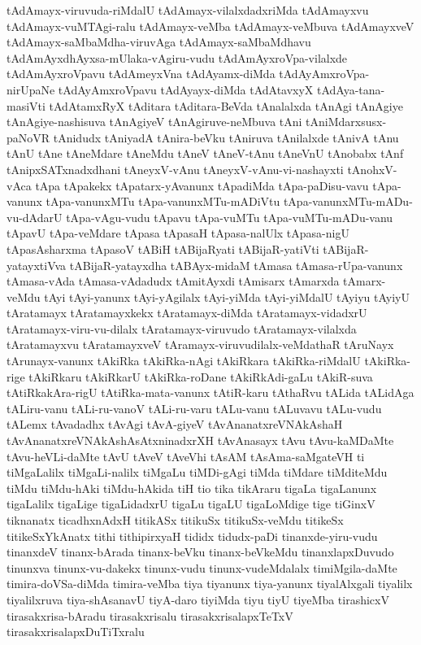 {tAdAmayx-viruvuda-riMdalU
tAdAmayx-vilalxdadxriMda
tAdAmayxvu
tAdAmayx-vuMTAgi-ralu
tAdAmayx-veMba
tAdAmayx-veMbuva
tAdAmayxveV
tAdAmayx-saMbaMdha-viruvAga
tAdAmayx-saMbaMdhavu
tAdAmAyxdhAyxsa-mUlaka-vAgiru-vudu
tAdAmAyxroVpa-vilalxde
tAdAmAyxroVpavu
tAdAmeyxVna
tAdAyamx-diMda
tAdAyAmxroVpa-nirUpaNe
tAdAyAmxroVpavu
tAdAyayx-diMda
tAdAtavxyX
tAdAya-tana-masiVti
tAdAtamxRyX
tAditara
tAditara-BeVda
tAnalalxda
tAnAgi
tAnAgiye
tAnAgiye-nashisuva
tAnAgiyeV
tAnAgiruve-neMbuva
tAni
tAniMdarxsusx-paNoVR
tAnidudx
tAniyadA
tAnira-beVku
tAniruva
tAnilalxde
tAnivA
tAnu
tAnU
tAne
tAneMdare
tAneMdu
tAneV
tAneV-tAnu
tAneVnU
tAnobabx
tAnf
tAnipxSATxnadxdhani
tAneyxV-vAnu
tAneyxV-vAnu-vi-nashayxti
tAnohxV-vAca
tApa
tApakekx
tApatarx-yAvanunx
tApadiMda
tApa-paDisu-vavu
tApa-vanunx
tApa-vanunxMTu
tApa-vanunxMTu-mADiVtu
tApa-vanunxMTu-mADu-vu-dAdarU
tApa-vAgu-vudu
tApavu
tApa-vuMTu
tApa-vuMTu-mADu-vanu
tApavU
tApa-veMdare
tApasa
tApasaH
tApasa-nalUlx
tApasa-nigU
tApasAsharxma
tApasoV
tABiH
tABijaRyati
tABijaR-yatiVti
tABijaR-yatayxtiVva
tABijaR-yatayxdha
tABAyx-midaM
tAmasa
tAmasa-rUpa-vanunx
tAmasa-vAda
tAmasa-vAdadudx
tAmitAyxdi
tAmisarx
tAmarxda
tAmarx-veMdu
tAyi
tAyi-yanunx
tAyi-yAgilalx
tAyi-yiMda
tAyi-yiMdalU
tAyiyu
tAyiyU
tAratamayx
tAratamayxkekx
tAratamayx-diMda
tAratamayx-vidadxrU
tAratamayx-viru-vu-dilalx
tAratamayx-viruvudo
tAratamayx-vilalxda
tAratamayxvu
tAratamayxveV
tAramayx-viruvudilalx-veMdathaR
tAruNayx
tArunayx-vanunx
tAkiRka
tAkiRka-nAgi
tAkiRkara
tAkiRka-riMdalU
tAkiRka-rige
tAkiRkaru
tAkiRkarU
tAkiRka-roDane
tAkiRkAdi-gaLu
tAkiR-suva
tAtiRkakAra-rigU
tAtiRka-mata-vanunx
tAtiR-karu
tAthaRvu
tALida
tALidAga
tALiru-vanu
tALi-ru-vanoV
tALi-ru-varu
tALu-vanu
tALuvavu
tALu-vudu
tALemx
tAvadadhx
tAvAgi
tAvA-giyeV
tAvAnanatxreVNAkAshaH
tAvAnanatxreVNAkAshAsAtxninadxrXH
tAvAnasayx
tAvu
tAvu-kaMDaMte
tAvu-heVLi-daMte
tAvU
tAveV
tAveVhi
tAsAM
tAsAma-saMgateVH
ti
tiMgaLalilx
tiMgaLi-nalilx
tiMgaLu
tiMDi-gAgi
tiMda
tiMdare
tiMditeMdu
tiMdu
tiMdu-hAki
tiMdu-hAkida
tiH
tio
tika
tikAraru
tigaLa
tigaLanunx
tigaLalilx
tigaLige
tigaLidadxrU
tigaLu
tigaLU
tigaLoMdige
tige
tiGinxV
tiknanatx
ticadhxnAdxH
titikASx
titikuSx
titikuSx-veMdu
titikeSx
titikeSxYkAnatx
tithi
tithipirxyaH
tididx
tidudx-paDi
tinanxde-yiru-vudu
tinanxdeV
tinanx-bArada
tinanx-beVku
tinanx-beVkeMdu
tinanxlapxDuvudo
tinunxva
tinunx-vu-dakekx
tinunx-vudu
tinunx-vudeMdalalx
timiMgila-daMte
timira-doVSa-diMda
timira-veMba
tiya
tiyanunx
tiya-yanunx
tiyalAlxgali
tiyalilx
tiyalilxruva
tiya-shAsanavU
tiyA-daro
tiyiMda
tiyu
tiyU
tiyeMba
tirashicxV
tirasakxrisa-bAradu
tirasakxrisalu
tirasakxrisalapxTeTxV
tirasakxrisalapxDuTiTxralu
}
